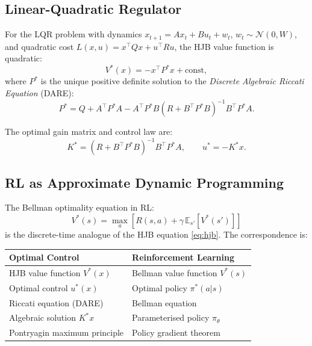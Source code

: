 \documentclass[11pt, a4paper]{article}
\newcommand{\E}{\mathbb{E}}
\newcommand{\N}{\mathcal{N}}
\newcommand{\T}{\top}
\begin{document}
\subsection{Linear-Quadratic Regulator}

For the LQR problem with dynamics $x_{t+1} = Ax_t + Bu_t + w_t$, $w_t \sim \N(0, W)$,
and quadratic cost $L(x, u) = x^\T Qx + u^\T Ru$, the HJB value function is quadratic:
\begin{equation}
    V^*(x) = -x^\T P^* x + \text{const},
    \label{eq:lqr_value}
\end{equation}
where $P^*$ is the unique positive definite solution to the \emph{Discrete
Algebraic Riccati Equation} (DARE):
\begin{equation}
    P^* = Q + A^\T P^* A - A^\T P^* B(R + B^\T P^* B)^{-1} B^\T P^* A.
    \label{eq:dare}
\end{equation}

The optimal gain matrix and control law are:
\begin{equation}
    K^* = (R + B^\T P^* B)^{-1} B^\T P^* A, \qquad u^* = -K^* x.
    \label{eq:lqr_opt}
\end{equation}

\subsection{RL as Approximate Dynamic Programming}

The Bellman optimality equation in RL:
\begin{equation}
    V^*(s) = \max_a \left[ R(s,a) + \gamma \, \E_{s'}[V^*(s')] \right]
\end{equation}
is the discrete-time analogue of the HJB equation \eqref{eq:hjb}.
The correspondence is:
\begin{center}
\begin{tabular}{ll}
\toprule
\textbf{Optimal Control} & \textbf{Reinforcement Learning} \\
\midrule
HJB value function $V^*(x)$ & Bellman value function $V^*(s)$ \\
Optimal control $u^*(x)$ & Optimal policy $\pi^*(a|s)$ \\
Riccati equation (DARE) & Bellman equation \\
Algebraic solution $K^* x$ & Parameterised policy $\pi_\theta$ \\
Pontryagin maximum principle & Policy gradient theorem \\
\bottomrule
\end{tabular}
\end{center}
\end{document}
